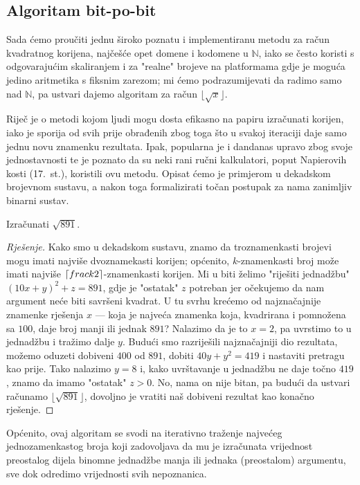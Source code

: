 \documentclass[12pt]{scrartcl}
\newcommand{\primjer}[2]{%
    \renewcommand\qedsymbol{$\vartriangleleft$}%
    \begin{example}%
        #1%
    \end{example}%
    \begin{proof}[Rješenje]%
        #2%
    \end{proof}%
    \renewcommand\qedsymbol{$\Square$}
}
\begin{document}
\subsection{Algoritam bit-po-bit}
Sada ćemo proučiti jednu široko poznatu i implementiranu metodu za račun kvadratnog korijena, najčešće opet domene i kodomene u
$\mathbb{N}$, iako se često koristi s odgovarajućim skaliranjem i za "realne" brojeve
 na platformama gdje je moguća jedino aritmetika s fiksnim zarezom; mi ćemo podrazumijevati da radimo samo nad $\mathbb N$, pa ustvari
 dajemo algoritam za račun $\lfloor\sqrt x\rfloor$.

Riječ je o metodi kojom ljudi mogu dosta efikasno na papiru izračunati korijen, iako je sporija od svih prije obrađenih zbog toga
što u svakoj iteraciji daje samo jednu novu znamenku rezultata. Ipak, popularna je i dandanas upravo zbog svoje jednostavnosti te je
poznato da su neki rani ručni kalkulatori, poput Napierovih kosti (17.\ st.), koristili ovu metodu.
 Opisat ćemo je primjerom
u dekadskom brojevnom sustavu, a nakon toga formalizirati točan postupak za nama zanimljiv binarni sustav.

\primjer{Izračunati $\sqrt{891}$.}
{Kako smo u dekadskom sustavu, znamo da troznamenkasti brojevi mogu imati najviše dvoznamekasti korijen; općenito, $k$-znamenkasti broj
može imati najviše $\lceil\\frac{k}{2}\rceil$-znamenkasti korijen. Mi u biti želimo "riješiti jednadžbu" $(10x+y)^2+z=891$, gdje je 
"ostatak" $z$ potreban jer očekujemo da nam argument neće biti savršeni kvadrat. U tu svrhu krećemo od najznačajnije znamenke rješenja
$x$ --- koja je najveća znamenka koja, kvadrirana i pomnožena sa $100$, daje broj manji ili jednak $891$? Nalazimo da je to $x=2$, pa
uvrstimo to u jednadžbu i tražimo dalje $y$. Budući smo razriješili najznačajniji dio rezultata, možemo oduzeti dobiveni $400$ od $891$,
dobiti $40y+y^2=419$
i nastaviti pretragu kao prije. Tako nalazimo $y=8$ i, kako uvrštavanje u jednadžbu ne daje točno $419$,
znamo da imamo "ostatak" $z>0$. No, nama on nije bitan, pa budući da ustvari računamo $\lfloor\sqrt{891}\rfloor$,
 dovoljno je vratiti naš dobiveni rezultat kao konačno rješenje.}

Općenito, ovaj algoritam se svodi na iterativno traženje najvećeg jednozamenkastog
broja koji zadovoljava da mu je izračunata vrijednost preostalog dijela binomne jednadžbe manja ili jednaka (preostalom) argumentu, sve
dok odredimo vrijednosti svih nepoznanica.
\end{document}
